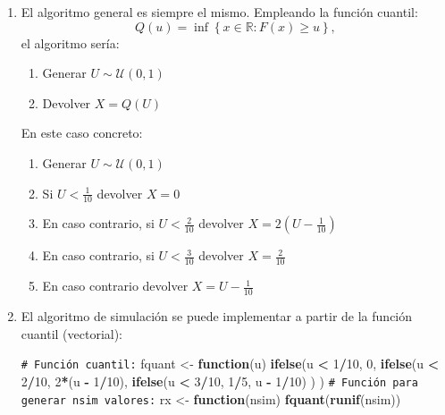 \documentclass[
  spanish,
  10pt,
]{book}
\newenvironment{Shaded}{\begin{snugshade}}{\end{snugshade}}
\newcommand{\CommentTok}[1]{\textcolor[rgb]{0.56,0.35,0.01}{\textit{#1}}}
\newcommand{\ControlFlowTok}[1]{\textcolor[rgb]{0.13,0.29,0.53}{\textbf{#1}}}
\newcommand{\DecValTok}[1]{\textcolor[rgb]{0.00,0.00,0.81}{#1}}
\newcommand{\FunctionTok}[1]{\textcolor[rgb]{0.13,0.29,0.53}{\textbf{#1}}}
\newcommand{\NormalTok}[1]{#1}
\newcommand{\OtherTok}[1]{\textcolor[rgb]{0.56,0.35,0.01}{#1}}
\newcommand{\SpecialCharTok}[1]{\textcolor[rgb]{0.81,0.36,0.00}{\textbf{#1}}}
\theoremstyle{break}
\theoremstyle{nonumberplain}
\renewcommand{\CommentTok}[1]{\textcolor[rgb]{0.41,0.41,0.41}{\texttt{#1}}}
\begin{document}
\begin{enumerate}
\def\labelenumi{\alph{enumi})}
\item
  El algoritmo general es siempre el mismo. Empleando la función cuantil:
  \[Q\left( u\right) = \inf \left\{ x\in \mathbb{R}:F\left( x\right) 
  \geq u\right\},\]
  el algoritmo sería:

  \begin{enumerate}
  \def\labelenumii{\arabic{enumii}.}
  \item
    Generar \(U\sim \mathcal{U}\left( 0,1\right)\)
  \item
    Devolver \(X=Q\left( U\right)\)
  \end{enumerate}

  En este caso concreto:

  \begin{enumerate}
  \def\labelenumii{\arabic{enumii}.}
  \item
    Generar \(U\sim \mathcal{U}\left( 0,1\right)\)
  \item
    Si \(U < \frac{1}{10}\) devolver \(X = 0\)
  \item
    En caso contrario, si \(U < \frac{2}{10}\) devolver \(X = 2(U - \frac{1}{10})\)
  \item
    En caso contrario, si \(U < \frac{3}{10}\) devolver \(X = \frac{2}{10}\)
  \item
    En caso contrario devolver \(X = U - \frac{1}{10}\)
  \end{enumerate}
\item
  El algoritmo de simulación se puede implementar a partir de la función cuantil
  (vectorial):

\begin{Shaded}
\begin{Highlighting}[]
\CommentTok{\# Función cuantil:}
\NormalTok{fquant }\OtherTok{\textless{}{-}} \ControlFlowTok{function}\NormalTok{(u) }
  \FunctionTok{ifelse}\NormalTok{(u }\SpecialCharTok{\textless{}} \DecValTok{1}\SpecialCharTok{/}\DecValTok{10}\NormalTok{, }\DecValTok{0}\NormalTok{,}
         \FunctionTok{ifelse}\NormalTok{(u }\SpecialCharTok{\textless{}} \DecValTok{2}\SpecialCharTok{/}\DecValTok{10}\NormalTok{, }\DecValTok{2}\SpecialCharTok{*}\NormalTok{(u }\SpecialCharTok{{-}} \DecValTok{1}\SpecialCharTok{/}\DecValTok{10}\NormalTok{),}
                \FunctionTok{ifelse}\NormalTok{(u }\SpecialCharTok{\textless{}} \DecValTok{3}\SpecialCharTok{/}\DecValTok{10}\NormalTok{, }\DecValTok{1}\SpecialCharTok{/}\DecValTok{5}\NormalTok{, u }\SpecialCharTok{{-}} \DecValTok{1}\SpecialCharTok{/}\DecValTok{10}\NormalTok{) ) )}
\CommentTok{\# Función para generar nsim valores:}
\NormalTok{rx }\OtherTok{\textless{}{-}} \ControlFlowTok{function}\NormalTok{(nsim) }\FunctionTok{fquant}\NormalTok{(}\FunctionTok{runif}\NormalTok{(nsim))}
\end{Highlighting}
\end{Shaded}


\end{enumerate}
\end{document}
